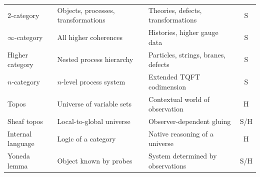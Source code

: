 \documentclass[12pt]{article}
\theoremstyle{definition}
\theoremstyle{remark}
\begin{document}
\begin{longtable}{@{}L{3.9cm}L{4.3cm}L{3.2cm}c@{}}
2-category & Objects, processes, transformations & Theories, defects, transformations & S\\
$\infty$-category & All higher coherences & Histories, higher gauge data & S\\
Higher category & Nested process hierarchy & Particles, strings, branes, defects & S\\
$n$-category & $n$-level process system & Extended TQFT codimension & S\\
Topos & Universe of variable sets & Contextual world of observation & H\\
Sheaf topos & Local-to-global universe & Observer-dependent gluing & S/H\\
Internal language & Logic of a category & Native reasoning of a universe & H\\
Yoneda lemma & Object known by probes & System determined by observations & S/H\\
\end{longtable}
\end{document}
